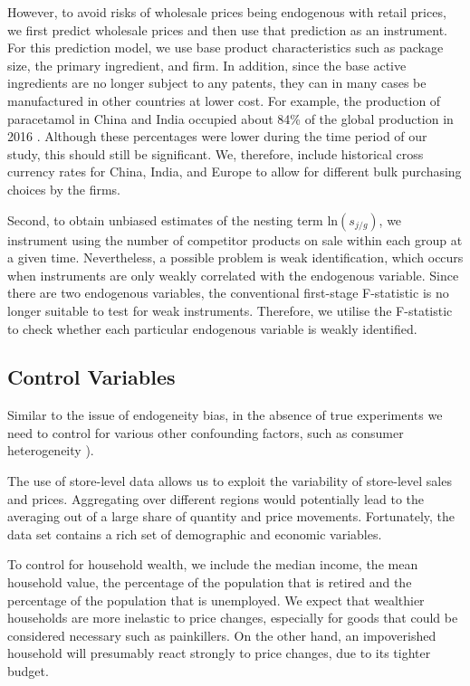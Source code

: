 \documentclass[12pt, authoryear]{elsarticle}
\begin{document}
However, to avoid risks of wholesale prices being endogenous with retail prices, we first predict wholesale prices and then use that prediction as an instrument. For this prediction model, we use base product characteristics such as package size, the primary ingredient, and firm. In addition, since the base active ingredients are no longer subject to any patents, they can in many cases be manufactured in other countries at lower cost. For example, the production of paracetamol in China and India occupied about 84\% of the global production in 2016 \citep{Information}. Although these percentages were lower during the time period of our study, this should still be significant. We, therefore, include historical cross currency rates for China, India, and Europe to allow for different bulk purchasing choices by the firms.

Second, to obtain unbiased estimates of the nesting term  ln$\left( s _ { j / g  } \right)$, we instrument using the number of competitor products on sale within each group at a given time. Nevertheless, a possible problem is weak identification, which occurs when instruments are only weakly correlated with the endogenous variable. Since there are two endogenous variables, the conventional first-stage F-statistic is no longer suitable to test for weak instruments. Therefore, we utilise the \cite{sanderson2016weak} F-statistic to check whether each particular endogenous variable is weakly identified.

\subsection{Control Variables}

Similar to the issue of endogeneity bias, in the absence of true experiments we need to control for various other confounding factors, such as consumer heterogeneity \cite{chintagunta_balancing_2003}).

The use of store-level data allows us to exploit the variability of store-level sales and prices. Aggregating over different regions would potentially lead to the averaging out of a large share of quantity and price movements. Fortunately, the data set contains a rich set of demographic and economic variables. 

To control for household wealth, we include the median income, the mean household value, the percentage of the population that is retired and the percentage of the population that is unemployed. We expect that wealthier households are more inelastic to price changes, especially for goods that could be considered necessary such as painkillers. On the other hand, an impoverished household will presumably react strongly to price changes, due to its tighter budget.
\end{document}
